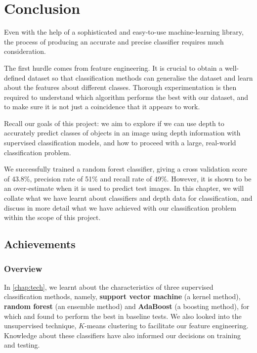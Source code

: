 \chapter{Conclusion} \label{chap:conclusion}
Even with the help of a sophisticated and easy-to-use machine-learning library, the process of producing an accurate and precise classifier requires much consideration. 

The first hurdle comes from feature engineering. It is crucial to obtain a well-defined dataset so that classification methods can generalise the dataset and learn about the features about different classes. Thorough experimentation is then required to understand which algorithm performs the best with our dataset, and to make sure it is not just a coincidence that it appears to work.

Recall our goals of this project: we aim to explore if we can use depth to accurately predict classes of objects in an image using depth information with supervised classification models, and how to proceed with a large, real-world classification problem. 

We successfully trained a random forest classifier, giving a cross validation score of 43.8\%, precision rate of 51\% and recall rate of 49\%. However, it is shown to be an over-estimate when it is used to predict test images. In this chapter, we will collate what we have learnt about classifiers and depth data for classification, and discuss in more detail what we have achieved with our classification problem within the scope of this project.

\newpage
\section{Achievements} \label{sec:conc-achieve}

\subsection*{Overview}
In \autoref{chap:tech}, we learnt about the characteristics of three supervised classification methods, namely, \textbf{support vector machine} (a kernel method), \textbf{random forest} (an ensemble method) and \textbf{AdaBoost} (a boosting method), for which  and  found to perform the best in baseline tests. We also looked into the unsupervised technique, $K$-means clustering to facilitate our feature engineering. Knowledge about these classifiers have also informed our decisions on training and testing. 

